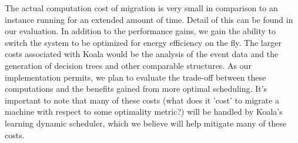 The actual computation cost of migration is very small in comparison to an instance running for an extended amount of time.  Detail of this can be found in our evaluation.  In addition to the performance gains, we gain the ability to switch the system to be optimized for energy efficiency on the fly.  The larger costs associated with Koala would be the analysis of the event data and the generation of decision trees and other comparable structures.  As our implementation permits, we plan to evaluate the trade-off between these computations and the benefits gained from more optimal scheduling.  It's important to note that many of these costs (what does it 'cost' to migrate a machine with respect to some optimality metric?) will be handled by Koala's learning dynamic scheduler, which we believe will help mitigate many of these costs.
